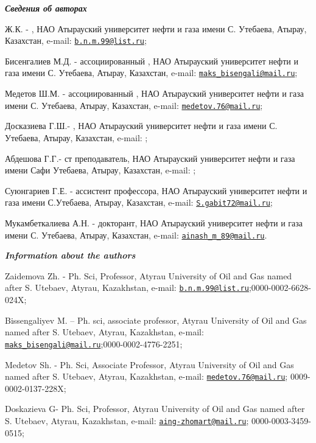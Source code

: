 \begin{authorinfo}
\emph{{\bfseries Сведения об авторах}}

Ж.К. - , НАО
Атырауский университет нефти и газа имени С. Утебаева, Атырау,
Казахстан, e-mail:
\href{mailto:b.n.m.99@list.ru}{\nolinkurl{b.n.m.99@list.ru}};

Бисенгалиев М.Д. -  ассоциированный
, НАО Атырауский университет нефти и газа имени С.
Утебаева, Атырау, Казахстан, e-mail:
\href{mailto:maks_bisengali@mail.ru}{\nolinkurl{maks\_bisengali@mail.ru}};

Медетов Ш.М. -  ассоциированный
, НАО Атырауский университет нефти и газа имени С.
Утебаева, Атырау, Казахстан, e-mail:
\href{mailto:medetov.76@mail.ru}{\nolinkurl{medetov.76@mail.ru}};

Досказиева Г.Ш.- , НАО
Атырауский университет нефти и газа имени С. Утебаева, Атырау,
Казахстан, e-mail:
\href{mailto:doskaziyeva.gulsin@gmail.com}{};

Абдешова Г.Г.- ст преподаватель, НАО Атырауский университет нефти и газа
имени Сафи Утебаева, Атырау, Казахстан, e-mail:
\href{mailto:gulya6320@mail.ru}{};

Суюнгариев Г.Е. -  ассистент профессора,
НАО Атырауский университет нефти и газа имени С.Утебаева, Атырау,
Казахстан, e-mail:
\href{mailto:S.gabit72@mail.ru}{\nolinkurl{S.gabit72@mail.ru}};

Мукамбеткалиева А.Н. - докторант, НАО Атырауский университет нефти и
газа имени С. Утебаева, Атырау, Казахстан, e-mail:
\href{mailto:ainash_m_89@mail.ru}{\nolinkurl{ainash\_m\_89@mail.ru}}.

\emph{{\bfseries Information about the authors}}

Zaidemova Zh. - Ph. Sci, Professor, Atyrau Uni󠀁versity of Oil and Gas
nam󠀁ed aft󠀁er S. Ute󠀁baev, Aty󠀁rau, Kaz󠀁akhstan, e-mail:
\href{mailto:b.n.m.99@list.ru}{\nolinkurl{b.n.m.99@list.ru}};0000-0002-6628-024X;

Bissengaliyev M. -- Ph. sci, associate professor, Atyrau Uni󠀁versity of
Oil and Gas nam󠀁ed aft󠀁er S. Ute󠀁baev, Aty󠀁rau, Kaz󠀁akhstan, e-mail:
\href{mailto:maks_bisengali@mail.ru}{\nolinkurl{maks\_bisengali@mail.ru}};0000-0002-4776-2251;

Medetov Sh. - Ph. Sci, Associate Professor, Atyrau Uni󠀁versity of Oil and
Gas nam󠀁ed aft󠀁er S. Ute󠀁baev, Aty󠀁rau, Kaz󠀁akhstan, e-mail:
\href{mailto:medetov.76@mail.ru}{\nolinkurl{medetov.76@mail.ru}};
0009-0002-0137-228X;

Doskazieva G- Ph. Sci, Professor, Atyrau Uni󠀁versity of Oil and Gas nam󠀁ed
aft󠀁er S. Ute󠀁baev, Aty󠀁rau, Kaz󠀁akhstan, e-mail:
\href{mailto:aing-zhomart@mail.ru}{\nolinkurl{aing-zhomart@mail.ru}};
0000-0003-3459-0515;


\end{authorinfo}
